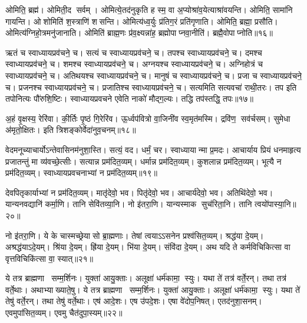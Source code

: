 ओमिति॒ ब्रह्म॑। ओमिती॒द सर्वम्। ओमित्ये॒तद॑नुकृति ह स्म॒ वा अ॒प्योश्रा॑व॒येत्याश्रा॑वयन्ति। ओमिति॒ सामा॑नि गायन्ति। ओशोमिति॑ श॒स्त्राणि॑ शसन्ति। ओमित्य॑ध्व॒र्युः प्र॑तिग॒रं प्रति॑गृणाति। ओमिति॒ ब्रह्मा॒ प्रसौ॑ति। ओमित्य॑ग्निहो॒त्रमनु॑जानाति। ओमिति॑ ब्राह्म॒णः प्र॑व॒क्ष्यन्ना॑ह॒ ब्रह्मोपाप्नवा॒नीति॑। ब्रह्मै॒वो\-पाप्नोति॥१६॥%
\anuvakamend[ओन्दश॑]

ऋतं च स्वाध्यायप्रव॑चने॒ च। सत्यं च स्वाध्यायप्रव॑चने॒ च। तपश्च स्वाध्यायप्रव॑चने॒ च। दमश्च स्वाध्यायप्रव॑चने॒ च। शमश्च स्वाध्यायप्रव॑चने॒ च। अग्नयश्च स्वाध्यायप्रव॑चने॒ च। अग्निहोत्रं च स्वाध्यायप्रव॑चने॒ च। अतिथयश्च स्वाध्यायप्रव॑चने॒ च। मानुषं च स्वाध्यायप्रव॑चने॒ च। प्रजा च स्वाध्यायप्रव॑चने॒ च। प्रजनश्च स्वाध्यायप्रव॑चने॒ च। प्रजातिश्च स्वाध्यायप्रव॑चने॒ च। सत्यमिति सत्यवचा॑ राथी॒तरः। तप इति तपोनित्यः पौ॑रुशि॒ष्टिः। स्वाध्यायप्रवचने एवेति नाको॑ मौद्ग॒ल्यः। तद्धि तप॑स्तद्धि॒ तपः॥१७॥
\anuvakamend[प्रजा च स्वाध्यायप्रव॑चने॒ च षट्च॑]

अ॒हं वृ॒क्षस्य॒ रेरि॑वा। की॒र्तिः पृ॒ष्ठं गि॒रेरि॑व। ऊ॒र्ध्वप॑वित्रो वा॒जिनी॑व स्व॒मृत॑मस्मि। द्रवि॑ण॒ सव॑र्चसम्। सुमेधा अ॑मृतो॒क्षितः। इति त्रिशङ्कोर्वेदा॑नुव॒चनम्॥१८॥
\anuvakamend[अ॒ह षट्]

वेदमनूच्याचार्योऽन्तेवासिनम॑नुशा॒स्ति। सत्यं॒ वद। धर्मं॒ चर। स्वाध्यायान्मा प्र॒मदः। आचार्याय प्रियं धनमाहृत्य प्रजातन्तुं मा व्य॑वच्छे॒त्सीः। सत्यान्न प्रम॑दित॒व्यम्। धर्मान्न प्रम॑दित॒व्यम्। कुशलान्न प्रम॑दित॒व्यम्। भूत्यै न प्रम॑दित॒व्यम्। स्वाध्यायप्रवचनाभ्यां न प्रम॑दित॒व्यम्॥१९॥

देवपितृकार्याभ्यां न प्रम॑दित॒व्यम्। मातृ॑देवो॒ भव। पितृ॑देवो॒ भव। आचार्य॑देवो॒ भव। अतिथि॑देवो॒ भव। यान्यनवद्यानि॑ कर्मा॒णि। तानि सेवि॑तव्या॒नि। नो इ॑तरा॒णि। यान्यस्माक सुच॑रिता॒नि। तानि त्वयो॑पास्या॒नि॥२०॥

नो इ॑तरा॒णि। ये के चास्मच्छ्रेयासो ब्रा॒ह्मणाः। तेषां त्वयाऽऽसनेन प्रश्व॑सित॒व्यम्। श्रद्ध॑या दे॒यम्। अश्रद्ध॑याऽदे॒यम्। श्रि॑या दे॒यम्। ह्रि॑या दे॒यम्। भि॑या दे॒यम्। संवि॑दा दे॒यम्। अथ यदि ते कर्मविचिकित्सा वा वृत्तविचिकि॑त्सा वा॒ स्यात्॥२१॥

ये तत्र ब्राह्मणा सम्म॒र्\mbox{}शिनः। युक्ता॑ आयु॒क्ताः। अलूक्षा॑ धर्म॑कामा॒ स्युः। यथा ते॑ तत्र॑ वर्ते॒रन्। तथा तत्र॑ वर्ते॒थाः। अथाभ्याख्याते॒षु। ये तत्र ब्राह्मणा सम्म॒र्\mbox{}शिनः। युक्ता॑ आयु॒क्ताः। अलूक्षा॑ धर्म॑कामा॒ स्युः। यथा ते॑ तेषु॑ वर्ते॒रन्। तथा तेषु॑ वर्ते॒थाः। एष॑ आदे॒शः। एष उ॑पदे॒शः। एषा वे॑दोप॒निषत्। एतद॑नुशा॒सनम्। एवमुपा॑सित॒व्यम्। एवमु चैत॑दुपा॒स्यम्॥२२॥
\anuvakamend[स्वाध्यायप्रवचनाभ्यान्न प्रम॑दित॒व्यं तानि त्वयो॑पास्या॒नि स्यात्तेषु॑ वर्ते॒रन्त्स॒प्त च॑]

